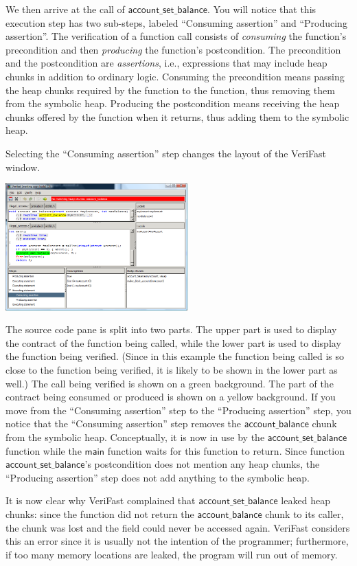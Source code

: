 \documentclass{article}
\begin{document}
We then arrive at the call of $\mathsf{account\_set\_balance}$.
You will notice that this execution step has two sub-steps,
labeled ``Consuming assertion'' and ``Producing assertion''.
The verification of a function call consists of
\emph{consuming} the function's precondition and then
\emph{producing} the function's postcondition. The precondition
and the postcondition are \emph{assertions}, i.e., expressions
that may include heap chunks in addition to ordinary logic.
Consuming the precondition means passing the heap chunks
required by the function to the function, thus removing them
from the symbolic heap. Producing the postcondition means
receiving the heap chunks offered by the function when it
returns, thus adding them to the symbolic heap.

Selecting the ``Consuming assertion'' step changes the layout
of the VeriFast window.
\begin{center}
\includegraphics[width=7cm]{illegal_access3.png}
\end{center}
The source code pane is split into two
parts. The upper part is used to display the contract of the
function being called, while the lower part is used to display
the function being verified. (Since in this example the
function being called is so close to the function being
verified, it is likely to be shown in the lower part as well.)
The call being verified is shown on a green background. The
part of the contract being consumed or produced is shown on a
yellow background. If you move from the ``Consuming assertion''
step to the ``Producing assertion'' step, you notice that the
``Consuming assertion'' step removes the
$\mathsf{account\_balance}$ chunk from the symbolic heap.
Conceptually, it is now in use by the
$\mathsf{account\_set\_balance}$ function while the
$\mathsf{main}$ function waits for this function to return.
Since function $\mathsf{account\_set\_balance}$'s postcondition
does not mention any heap chunks, the ``Producing assertion''
step does not add anything to the symbolic heap.

It is now clear why VeriFast complained that
$\mathsf{account\_set\_balance}$ leaked heap chunks: since the
function did not return the $\mathsf{account\_balance}$ chunk
to its caller, the chunk was lost and the field could never be
accessed again. VeriFast considers this an error since it is
usually not the intention of the programmer; furthermore, if
too many memory locations are leaked, the program will run out
of memory.
\end{document}
